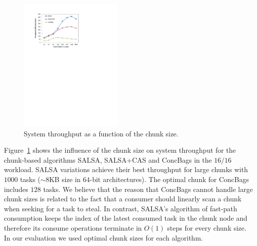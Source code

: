 \begin{figure}[htb]
 \begin{center}
   \includegraphics[width=0.45\textwidth]{figures/chunk-size}
 \end{center}
	\caption{\footnotesize{System throughput as a function of the chunk size. }}
	\label{fig:chunk-size}
\end{figure}
Figure~\ref{fig:chunk-size} shows the influence of the chunk size on system throughput for the chunk-based algorithms SALSA, SALSA+CAS and ConcBags in the $16/16$ workload. 
SALSA variations achieve their best throughput for large chunks with $1000$ tasks ($\sim8$KB size in $64$-bit architectures). The optimal chunk for ConcBags includes $128$ tasks. We believe that the reason that ConcBags cannot handle large chunk sizes is related to the fact that a consumer should linearly scan a chunk when seeking for a task to steal. In contrast, SALSA's algorithm of fast-path consumption keeps the index of the latest consumed task in the chunk node and therefore its consume operations terminate in $O(1)$ steps for every chunk size. 
In our evaluation we used optimal chunk sizes for each algorithm. 
